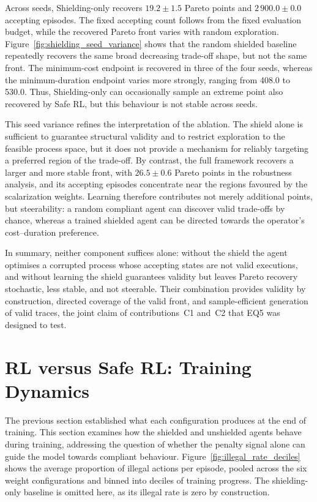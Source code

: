 Across seeds, Shielding-only recovers $19.2 \pm 1.5$ Pareto points and
$2\,900.0 \pm 0.0$ accepting episodes. The fixed accepting count follows
from the fixed evaluation budget, while the recovered Pareto front
varies with random exploration. Figure~\ref{fig:shielding_seed_variance}
shows that the random shielded baseline repeatedly recovers the same
broad decreasing trade-off shape, but not the same front. The
minimum-cost endpoint is recovered in three of the four seeds, whereas
the minimum-duration endpoint varies more strongly, ranging from 408.0
to 530.0. Thus, Shielding-only can occasionally sample an extreme point
also recovered by Safe \ac{RL}, but this behaviour is not stable across
seeds.

This seed variance refines the interpretation of the ablation. The
shield alone is sufficient to guarantee structural validity and to
restrict exploration to the feasible process space, but it does not
provide a mechanism for reliably targeting a preferred region of the
trade-off. By contrast, the full framework recovers a larger and more
stable front, with $26.5 \pm 0.6$ Pareto points in the robustness
analysis, and its accepting episodes concentrate near the regions
favoured by the scalarization weights. Learning therefore contributes
not merely additional points, but steerability: a random compliant agent
can discover valid trade-offs by chance, whereas a trained shielded
agent can be directed towards the operator's cost--duration preference.


In summary, neither component suffices alone: without the shield the
agent optimises a corrupted process whose accepting states are not
valid executions, and without learning the shield guarantees validity
but leaves Pareto recovery stochastic, less stable, and not steerable.
Their combination provides validity by construction, directed coverage
of the valid front, and sample-efficient generation of valid traces, the
joint claim of contributions~C1 and~C2 that EQ5 was designed to test.
\section{\ac{RL} versus Safe \ac{RL}: Training Dynamics}
\label{sec:rl_vs_safe_rl}

The previous section established what each configuration produces at the end of training. This section examines how the shielded and unshielded agents behave during training, addressing the question of whether the penalty signal alone can guide the model towards compliant behaviour. Figure~\ref{fig:illegal_rate_deciles} shows the average proportion of illegal actions per episode, pooled across the six weight configurations and binned into deciles of training progress. The shielding-only baseline is omitted here, as its illegal rate is zero by construction.

